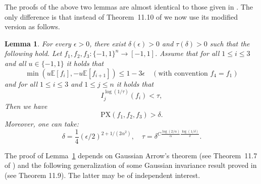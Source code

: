 \documentclass[11pt]{amsart}
\newcommand{\E}{\mathbb{E}}
\newcommand{\eps}{\epsilon}
\newcommand{\1}{\mathbf{1}}
\newcommand{\Px}{\mathrm{PX}}
\def\E{{\mathbb E}}
\theoremstyle{definition}
\theoremstyle{plain}
\newtheorem{lemma}[example]{Lemma}
\theoremstyle{remark}
\numberwithin{equation}{section}
\begin{document}
The proofs of the above two lemmas are almost identical to those given in \cite{Mossel11}.  The only difference is that instead of  Theorem~11.10 of \cite{Mossel11} we now use its modified version as follows.
\begin{lemma} \label{thm:arrow_low_inf}
For every $\eps > 0$, there exist $\delta(\eps) > 0$ and  $\tau(\delta) > 0$ such that the following hold.
Let $f_1,f_2,f_3 : \{-1,1\}^n \to [-1,1]$.
Assume that for all $1 \leq i \leq 3$ and all $u \in \{-1,1\}$ it holds that
\begin{equation} \label{eq:non_dict_low_inf}
\min(u \E[f_i], -u \E[f_{i+1}]) \leq 1-3\eps \quad (\text{with convention } f_4= f_1)
\end{equation}
and for all $1 \leq i \leq 3$ and $1 \leq j \leq n$ it holds that
\[
I_j^{\log(1/\tau)}(f_i) < \tau,
\]
Then we have
\[
\Px(f_1,f_2,f_3) > \delta.
\]
Moreover, one can take:
\[
\delta = \frac{1}{4}(\eps/2)^{2+1/(2 \alpha^2)}, \quad \tau = \delta^{C \frac{\log (2/\alpha)}{\alpha} \frac{\log(1/\delta)}{  \delta }}.
\]
\end{lemma}

The proof of  Lemma~\ref{thm:arrow_low_inf} depends on  Gaussian Arrow's theorem (see Theorem~11.7 of \cite{Mossel11})  and the following generalization of some Gaussian invariance result proved in \cite{Mossel11} (see Theorem 11.9). The latter may be of independent interest.

\end{document}
